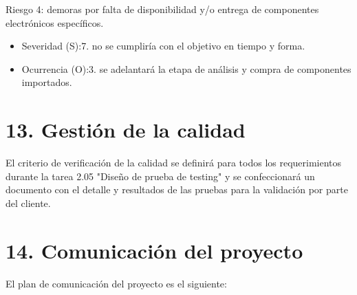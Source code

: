 \documentclass[11pt]{charter}
\begin{document}
Riesgo 4: demoras por falta de disponibilidad y/o entrega de componentes electrónicos específicos. 

\begin{itemize}
\item Severidad (S):7. no se cumpliría con el objetivo en tiempo y forma.
\item Ocurrencia (O):3. se adelantará la etapa de análisis y compra de componentes importados. 
\end{itemize}




\section{13. Gestión de la calidad}
\label{sec:calidad}

El criterio de verificación de la calidad se definirá para todos los requerimientos durante la tarea 2.05 "Diseño de prueba de testing" y se confeccionará un documento con el detalle y resultados de las pruebas para la validación por parte del cliente. 


\section{14. Comunicación del proyecto}
\label{sec:comunicaciones}

El plan de comunicación del proyecto es el siguiente:
\end{document}
